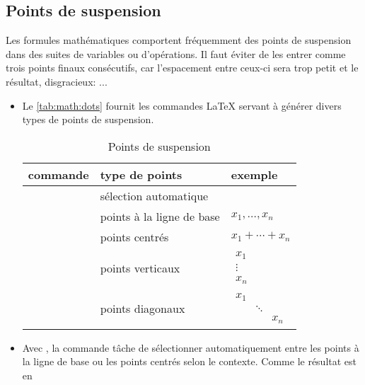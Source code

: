\subsection{Points de suspension}
\label{sec:math:bases:dots}

Les formules mathématiques comportent fréquemment des points de
suspension dans des suites de variables ou d'opérations. Il faut
éviter de les entrer comme trois points finaux consécutifs, car
l'espacement entre ceux-ci sera trop petit et le résultat,
disgracieux: $...$

\begin{itemize}
\item Le \autoref{tab:math:dots} fournit les commandes {\LaTeX}
  servant à générer divers types de points de suspension.
  \begin{table}
    \caption{Points de suspension}
    \label{tab:math:dots}
    \centering
    \begin{tabular}{lll}
      \toprule
      commande & type de points & exemple \\
      \midrule
      \cmd{\dots} &  sélection automatique \\
      \cmd{\ldots} & points à la ligne de base & $x_1, \ldots, x_n$ \\
      \cmd{\cdots} & points centrés & $x_1 + \cdots + x_n$ \\
      \cmd{\vdots} & points verticaux & $
                                        \begin{matrix}
                                          x_1 \\ \vdots \\ x_n
                                        \end{matrix}$ \\
      \cmd{\ddots} & points diagonaux & $
                                        \begin{matrix}
                                          x_1 &&\\ &\ddots& \\ && x_n
                                        \end{matrix}$ \\
      \bottomrule
    \end{tabular}
  \end{table}
\item Avec , la commande \cmd{\dots} tâche de
  sélectionner automatiquement entre les points à la ligne de base ou
  les points centrés selon le contexte. Comme le résultat est en

\end{itemize}
